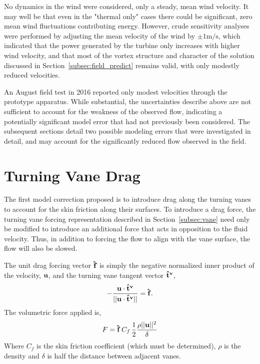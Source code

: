 


No dynamics in the wind were considered, only a steady, mean wind
velocity. It may well be that even in the "thermal only" cases there
could be significant, zero mean wind fluctuations contributing energy. 
However, crude sensitivity analyses were performed by
adjusting the mean velocity of the wind by  $\pm 1 \text{m}/\text{s}$,
which indicated that the power generated by the turbine only increases
with higher wind velocity, and that most of the vortex structure and
character of the solution discussed in
Section~\ref{subsec:field_predict} remains valid, with only modestly
reduced velocities. 


An August field test in 2016 reported only modest velocities through the 
prototype apparatus.
While substantial, the uncertainties describe above are not sufficient
to account for the weakness of the observed flow, indicating a
potentially significant model error that had not previously been
considered. The subsequent sections detail two possible modeling
errors that were investigated in detail, and may account
for the significantly reduced flow observed in the field. 

\section{Turning Vane Drag}
\label{sec:vane_drag}

The first model correction proposed is to introduce drag along the
turning vanes to account for the skin friction along their surfaces. To
introduce a drag force, the turning vane forcing 
representation described in Section~\ref{subsec:vane} need only be
modified to introduce an additional force that acts in opposition to the
fluid velocity. Thus, in addition to forcing the flow to align with the
vane surface, the flow will also be slowed. 

The unit drag forcing vector ${\bf \hat f}$ is simply the negative
normalized inner product of the velocity, ${\bf u}$, and the turning
vane tangent vector ${\bf \hat t^v}$,  
\begin{equation}
- \frac{{\bf u} \cdot {\bf \hat t^v}}{|| {\bf u} \cdot {\bf \hat t^v}
 ||} = {\bf \hat f}.  
\end{equation}
The volumetric force applied is, 
\begin{equation}
 F = {\bf \hat f} \, C_f \, \frac{1}{2} \frac{\rho || {\bf u} ||^2}{\delta}
\end{equation}
Where $C_f$ is the skin friction coefficient (which must be determined),
$\rho $ is the density and $\delta$ is half the distance between
adjacent vanes. 

